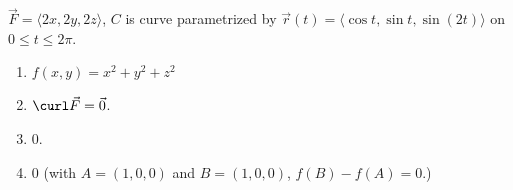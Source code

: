 {$\vec F = \langle 2x, 2y, 2z\rangle$, $C$ is curve parametrized by $\vec r(t) = \langle \cos t,\sin t, \sin (2t)\rangle$ on $0\leq t\leq 2\pi$. 
}
{\begin{enumerate}
\item		$f(x,y) = x^2+y^2+z^2$
\item	$\curl \vec F = \vec 0$.
\item		$0$.%
\item	$0$ (with $A = (1,0,0)$ and $B = (1,0,0)$, $f(B) - f(A) = 0$.)
\end{enumerate}
}
